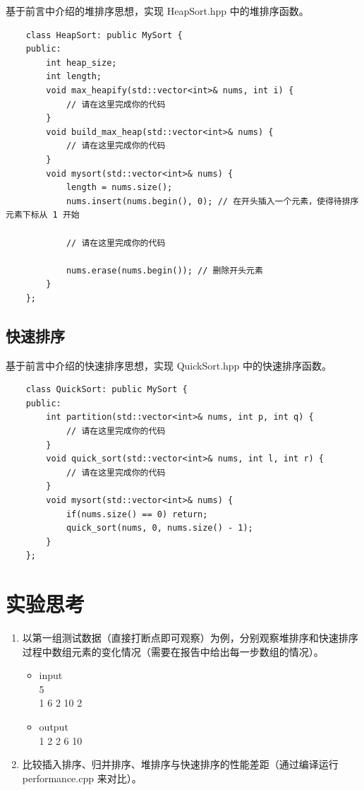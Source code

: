 \documentclass[12pt,a4paper]{article}
\begin{document}
基于前言中介绍的堆排序思想，实现 HeapSort.hpp 中的堆排序函数。

\begin{lstlisting}
    class HeapSort: public MySort {
    public:
        int heap_size;
        int length;
        void max_heapify(std::vector<int>& nums, int i) {
            // 请在这里完成你的代码
        }
        void build_max_heap(std::vector<int>& nums) {
            // 请在这里完成你的代码
        }
        void mysort(std::vector<int>& nums) {
            length = nums.size();
            nums.insert(nums.begin(), 0); // 在开头插入一个元素，使得待排序元素下标从 1 开始
            
            // 请在这里完成你的代码
            
            nums.erase(nums.begin()); // 删除开头元素
        }
    };
\end{lstlisting}



\subsection{快速排序}

基于前言中介绍的快速排序思想，实现 QuickSort.hpp 中的快速排序函数。

\begin{lstlisting}
    class QuickSort: public MySort {
    public:
        int partition(std::vector<int>& nums, int p, int q) {
            // 请在这里完成你的代码
        }
        void quick_sort(std::vector<int>& nums, int l, int r) {
            // 请在这里完成你的代码
        }
        void mysort(std::vector<int>& nums) {
            if(nums.size() == 0) return;
            quick_sort(nums, 0, nums.size() - 1);
        }
    };
\end{lstlisting}




\section{实验思考}

\begin{enumerate}
    \item 以第一组测试数据（直接打断点即可观察）为例，分别观察堆排序和快速排序过程中数组元素的变化情况（需要在报告中给出每一步数组的情况）。
          \begin{itemize}
              \item input \\ 5 \\ 1 6 2 10 2
              \item output \\ 1 2 2 6 10
          \end{itemize}

    \item 比较插入排序、归并排序、堆排序与快速排序的性能差距（通过编译运行 performance.cpp 来对比）。
\end{enumerate}
\end{document}
